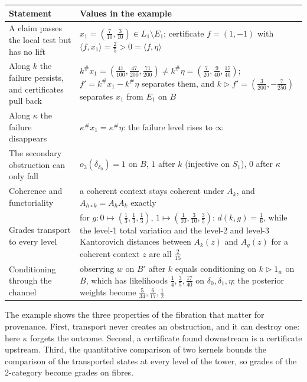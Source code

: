 \documentclass[11pt]{article}
\theoremstyle{definition}
\theoremstyle{remark}
\begin{document}
\begin{center}\small
\begin{tabular}{@{}R{0.3\textwidth}R{0.62\textwidth}@{}}
\toprule
Statement & Values in the example\\
\midrule
A claim passes the local test but has no lift & $x_1=(\tfrac7{10},\tfrac3{10})\in L_1\setminus E_1$; certificate $f=(1,-1)$ with
$\langle f,x_1\rangle=\tfrac25>0=\langle f,\eta\rangle$\\\addlinespace[2pt]
Along $k$ the failure persists, and certificates pull back & $k^\#x_1=(\tfrac{41}{100},\tfrac{47}{200},\tfrac{71}{200})\ne k^\#\eta=(\tfrac7{20},\tfrac9{40},\tfrac{17}{40})$;
$f'=k^\#x_1-k^\#\eta$ separates them, and $k\rhd f'=(\tfrac3{200},-\tfrac7{250})$ separates $x_1$ from $E_1$ on $B$\\\addlinespace[2pt]
Along $\kappa$ the failure disappears & $\kappa^\#x_1=\kappa^\#\eta$: the failure level rises to $\infty$\\\addlinespace[2pt]
The secondary obstruction can only fall & $o_3(\delta_{\delta_0})=1$ on $B$, $1$ after $k$ (injective on $S_1$), $0$ after $\kappa$\\\addlinespace[2pt]
Coherence and functoriality & a coherent context stays coherent under $A_k$, and $A_{h\circ k}=A_hA_k$ exactly\\\addlinespace[2pt]
Grades transport to every level & for $g\colon0\mapsto(\tfrac13,\tfrac13,\tfrac13)$, $1\mapsto(\tfrac1{10},\tfrac3{10},\tfrac35)$:
$d(k,g)=\tfrac16$, while the level-1 total variation and the level-2 and level-3 Kantorovich distances between
$A_k(z)$ and $A_g(z)$ for a coherent context $z$ are all $\tfrac2{15}$\\\addlinespace[2pt]
Conditioning through the channel & observing $w$ on $B'$ after $k$ equals conditioning on $k\rhd1_w$ on $B$, which has likelihoods
$\tfrac14,\tfrac35,\tfrac{17}{40}$ on $\delta_0,\delta_1,\eta$; the posterior weights become $\tfrac5{34},\tfrac6{17},\tfrac12$\\
\bottomrule
\end{tabular}
\end{center}

The example shows the three properties of the fibration that matter for provenance. First, transport never
creates an obstruction, and it can destroy one: here $\kappa$ forgets the outcome. Second, a certificate found
downstream is a certificate upstream. Third, the quantitative comparison of two kernels bounds the
comparison of the transported states at every level of the tower, so grades of the 2-category become grades
on fibres.
\end{document}
